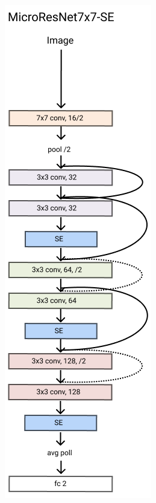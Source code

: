 \documentclass[../document.tex]{subfiles}
\begin{document}
\begin{figure}[htbp]
\begin{subfigure}[b]{0.22\textwidth}
        \caption{}
    \end{subfigure}
    \begin{subfigure}[b]{0.22\textwidth}
        \includegraphics[width=\textwidth]{../img/3/models/transparent-microresnet7x7-se.png}

\end{subfigure}
\end{figure}
\end{document}
